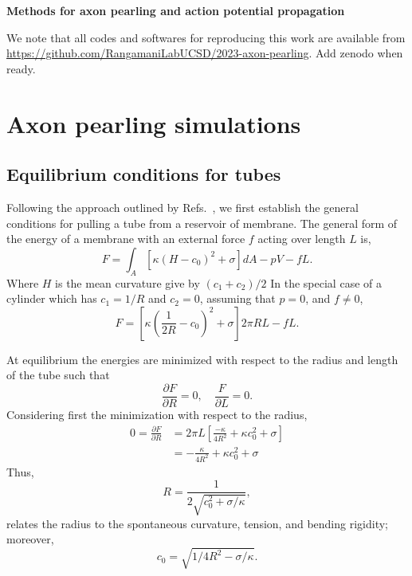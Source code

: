 \documentclass[11pt]{article}
\newcommand{\Red}[1]{{\color{red}#1}}
\begin{document}
\begin{centering}
    \textbf{\Large Methods for axon pearling and action potential propagation}\\[3mm]
\end{centering}

We note that all codes and softwares for reproducing this work are available from \url{https://github.com/RangamaniLabUCSD/2023-axon-pearling}.
\Red{Add zenodo when ready}.

\section{Axon pearling simulations}
\subsection{Equilibrium conditions for tubes}
Following the approach outlined by Refs.~\cite{DerenyiEtAl2002,ShurerEtAl2019}, we first establish the general conditions for pulling a tube from a reservoir of membrane.
The general form of the energy of a membrane with an external force \(f\) acting over length \(L\) is,
\begin{equation}
    F = \int_A \left[\kappa(H - c_0)^2 + \sigma \right]dA - pV - fL.
\end{equation}
Where \(H\) is the mean curvature give by \((c_1 + c_2)/2\)
In the special case of a cylinder which has \(c_1 = 1/R\) and \(c_2 = 0\), assuming that \(p=0\), and \(f\neq 0\),
\begin{equation}
    F = \left[ \kappa\left(\frac{1}{2R} - c_0\right)^2 + \sigma\right] 2\pi RL - fL.
\end{equation}

At equilibrium the energies are minimized with respect to the radius and length of the tube such that
\begin{equation}
    \frac{\partial F}{\partial R} = 0,\quad \frac{F}{\partial L} =0.
\end{equation}
Considering first the minimization with respect to the radius,
\begin{align*}
    0 = \frac{\partial F}{\partial R} & = 2\pi L\left[\frac{-\kappa}{4R^2} + \kappa c_0^2 + \sigma\right] \\
                                      & = - \frac{\kappa}{4R^2} + \kappa c_0^2 + \sigma
\end{align*}
Thus,
\begin{equation}
    R = \frac{1}{2\sqrt{c_0^2 + \sigma/\kappa}},
\end{equation}
relates the radius to the spontaneous curvature, tension, and bending rigidity; moreover,
\begin{equation}
    c_0 = \sqrt{1/4R^2 - \sigma/\kappa}.
    \label{eq:spontaneous_curvature_relation}
\end{equation}
\end{document}
